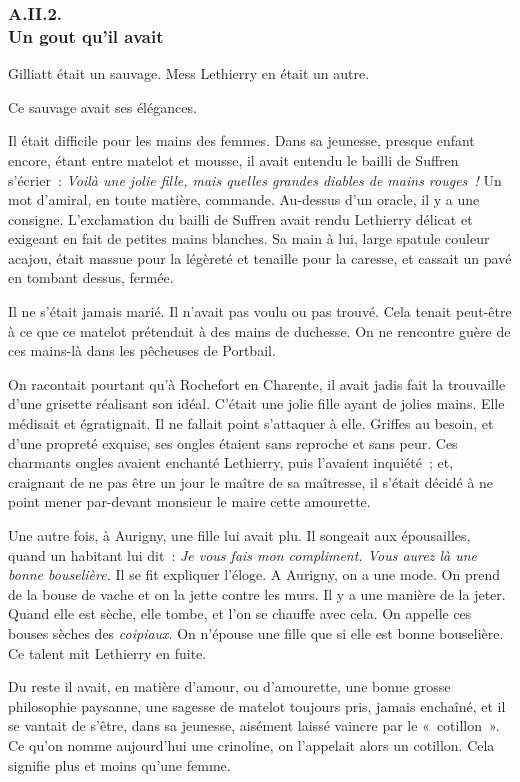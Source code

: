 \documentclass[french,twoside]{book} %
\begin{document}
 \subsubsection[{A.II.2. Un gout qu’il avait}]{A.II.2. \\
Un gout qu’il avait}
\noindent Gilliatt était un sauvage. Mess Lethierry en était un autre.\par
Ce sauvage avait ses élégances.\par
Il était difficile pour les mains des femmes. Dans sa jeunesse, presque enfant encore, étant entre matelot et mousse, il avait entendu le bailli de Suffren s’écrier : \emph{Voilà une jolie fille, mais quelles grandes diables de mains rouges !} Un mot d’amiral, en toute matière, commande. Au-dessus d’un oracle, il y a une consigne. L’exclamation du bailli de Suffren avait rendu Lethierry délicat et exigeant en fait de petites mains blanches. Sa main à lui, large spatule couleur acajou, était massue pour la légèreté et tenaille pour la caresse, et cassait un pavé en tombant dessus, fermée.\par
Il ne s’était jamais marié. Il n’avait pas voulu ou pas trouvé. Cela tenait peut-être à ce que ce matelot prétendait à des mains de duchesse. On ne rencontre  guère de ces mains-là dans les pêcheuses de Portbail.\par
On racontait pourtant qu’à Rochefort en Charente, il avait jadis fait la trouvaille d’une grisette réalisant son idéal. C’était une jolie fille ayant de jolies mains. Elle médisait et égratignait. Il ne fallait point s’attaquer à elle. Griffes au besoin, et d’une propreté exquise, ses ongles étaient sans reproche et sans peur. Ces charmants ongles avaient enchanté Lethierry, puis l’avaient inquiété ; et, craignant de ne pas être un jour le maître de sa maîtresse, il s’était décidé à ne point mener par-devant monsieur le maire cette amourette.\par
Une autre fois, à Aurigny, une fille lui avait plu. Il songeait aux épousailles, quand un habitant lui dit : \emph{Je vous fais mon compliment. Vous aurez là une bonne bouselière.} Il se fit expliquer l’éloge. A Aurigny, on a une mode. On prend de la bouse de vache et on la jette contre les murs. Il y a une manière de la jeter. Quand elle est sèche, elle tombe, et l’on se chauffe avec cela. On appelle ces bouses sèches des \emph{coipiaux}. On n’épouse une fille que si elle est bonne bouselière. Ce talent mit Lethierry en fuite.\par
Du reste il avait, en matière d’amour, ou d’amourette, une bonne grosse philosophie paysanne, une sagesse de matelot toujours pris, jamais enchaîné, et il se vantait de s’être, dans sa jeunesse, aisément laissé vaincre par le « cotillon ». Ce qu’on nomme aujourd’hui une crinoline, on l’appelait alors un cotillon. Cela signifie plus et moins qu’une femme.\par
\end{document}
